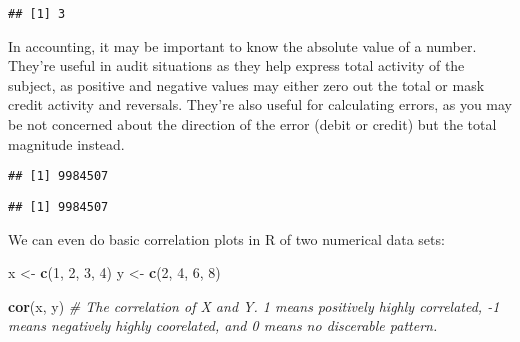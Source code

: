 \documentclass[
]{book}
\newenvironment{Shaded}{\begin{snugshade}}{\end{snugshade}}
\newcommand{\CommentTok}[1]{\textcolor[rgb]{0.56,0.35,0.01}{\textit{#1}}}
\newcommand{\DecValTok}[1]{\textcolor[rgb]{0.00,0.00,0.81}{#1}}
\newcommand{\KeywordTok}[1]{\textcolor[rgb]{0.13,0.29,0.53}{\textbf{#1}}}
\newcommand{\NormalTok}[1]{#1}
\newcommand{\OperatorTok}[1]{\textcolor[rgb]{0.81,0.36,0.00}{\textbf{#1}}}
\newcommand{\StringTok}[1]{\textcolor[rgb]{0.31,0.60,0.02}{#1}}
\begin{document}
\begin{verbatim}
## [1] 3
\end{verbatim}

In accounting, it may be important to know the absolute value of a number. They're useful in audit situations as they help express total activity of the subject, as positive and negative values may either zero out the total or mask credit activity and reversals. They're also useful for calculating errors, as you may be not concerned about the direction of the error (debit or credit) but the total magnitude instead.

\begin{Shaded}
\end{Shaded}

\begin{verbatim}
## [1] 9984507
\end{verbatim}

\begin{Shaded}
\end{Shaded}

\begin{verbatim}
## [1] 9984507
\end{verbatim}

We can even do basic correlation plots in R of two numerical data sets:

\begin{Shaded}
\begin{Highlighting}[]
\NormalTok{x <-}\StringTok{ }\KeywordTok{c}\NormalTok{(}\DecValTok{1}\NormalTok{, }\DecValTok{2}\NormalTok{, }\DecValTok{3}\NormalTok{, }\DecValTok{4}\NormalTok{)}
\NormalTok{y <-}\StringTok{ }\KeywordTok{c}\NormalTok{(}\DecValTok{2}\NormalTok{, }\DecValTok{4}\NormalTok{, }\DecValTok{6}\NormalTok{, }\DecValTok{8}\NormalTok{)}

\KeywordTok{cor}\NormalTok{(x, y) }\CommentTok{# The correlation of X and Y. 1 means positively highly correlated, -1 means negatively highly coorelated, and 0 means no discerable pattern.}
\end{Highlighting}
\end{Shaded}
\end{document}
